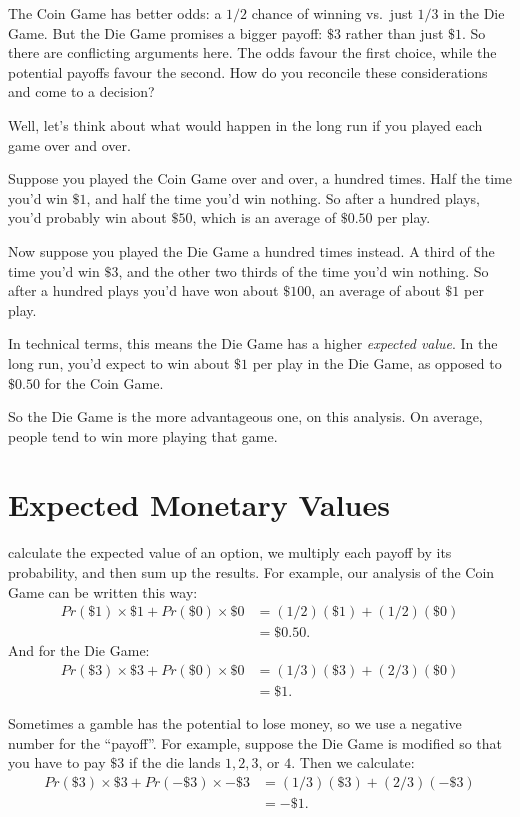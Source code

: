 \documentclass[justified]{tufte-book}
\newcommand{\p}{Pr}
\theoremstyle{definition}
\theoremstyle{definition}
\theoremstyle{definition}
\theoremstyle{remark}
\begin{document}
The Coin Game has better odds: a \(1/2\) chance of winning vs.~just
\(1/3\) in the Die Game. But the Die Game promises a bigger payoff:
\(\$3\) rather than just \(\$1\). So there are conflicting arguments
here. The odds favour the first choice, while the potential payoffs
favour the second. How do you reconcile these considerations and come to
a decision?

Well, let's think about what would happen in the long run if you played
each game over and over.

Suppose you played the Coin Game over and over, a hundred times. Half
the time you'd win \(\$1\), and half the time you'd win nothing. So
after a hundred plays, you'd probably win about \(\$50\), which is an
average of \(\$0.50\) per play.

Now suppose you played the Die Game a hundred times instead. A third of
the time you'd win \(\$3\), and the other two thirds of the time you'd
win nothing. So after a hundred plays you'd have won about \(\$100\), an
average of about \(\$1\) per play.

In technical terms, this means the Die Game has a higher \emph{expected
value}. In the long run, you'd expect to win about \(\$1\) per play in
the Die Game, as opposed to \(\$0.50\) for the Coin Game.

So the Die Game is the more advantageous one, on this analysis. On
average, people tend to win more playing that game.

\hypertarget{expected-monetary-values}{%
\section{Expected Monetary Values}\label{expected-monetary-values}}

 calculate the expected value of an option, we multiply
each payoff by its probability, and then sum up the results. For
example, our analysis of the Coin Game can be written this way: \[
  \begin{aligned}
    \p(\$1) \times \$1 + \p(\$0) \times \$0 &= (1/2)(\$1) + (1/2)(\$0)\\
      &= \$0.50.
  \end{aligned}
\] And for the Die Game: \[
  \begin{aligned}
    \p(\$3) \times \$3 + \p(\$0) \times \$0 &= (1/3)(\$3) + (2/3)(\$0)\\
      &= \$1.
  \end{aligned}
\]

Sometimes a gamble has the potential to lose money, so we use a negative
number for the ``payoff''. For example, suppose the Die Game is modified
so that you have to pay \(\$3\) if the die lands \(1, 2, 3\), or \(4\).
Then we calculate: \[
  \begin{aligned}
    \p(\$3) \times \$3 + \p(-\$3) \times -\$3 &= (1/3)(\$3) + (2/3)(-\$3)\\
      &= -\$1.
  \end{aligned}
\]
\end{document}

